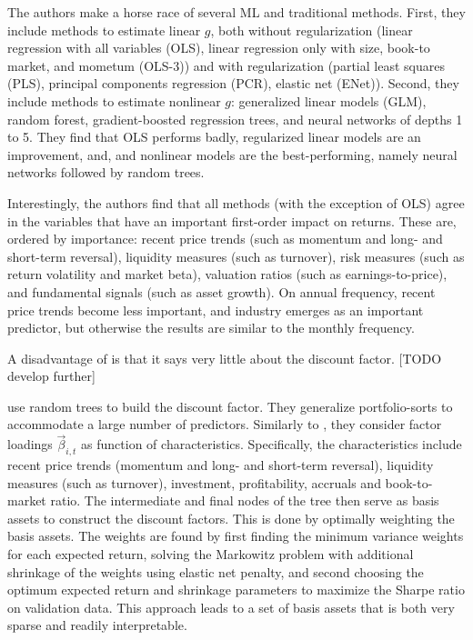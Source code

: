 		
		The authors make a horse race of several ML and traditional methods. First, they include methods to estimate linear $g$, both without regularization (linear regression with all variables (OLS), linear regression only with size, book-to market, and mometum (OLS-3)) and with regularization (partial least squares (PLS), principal components regression (PCR), elastic net (ENet)). Second, they include methods to estimate nonlinear $g$: generalized linear models (GLM), random forest, gradient-boosted regression trees, and neural networks of depths 1 to 5. They find that OLS performs badly, regularized linear models are an improvement, and, and nonlinear models are the best-performing, namely neural networks followed by random trees. 
		
		Interestingly, the authors find that all methods (with the exception of OLS) agree in the variables that have an important first-order impact on returns. These are, ordered by importance: recent price trends (such as momentum and long- and short-term reversal), liquidity measures (such as turnover), risk measures (such as return volatility and market beta), valuation ratios (such as earnings-to-price), and fundamental signals (such as asset growth). On annual frequency, recent price trends become less important, and industry emerges as an important predictor, but otherwise the results are similar to the monthly frequency.
		
		
		A disadvantage of \cite{gu2020empirical} is that it says very little about the discount factor. [TODO develop further] 
		
		
		\cite{bryzgalova2019forest} use random trees to build the discount factor. They generalize portfolio-sorts to accommodate a large number of predictors. Similarly to \cite{kelly2019characteristics}, they consider factor loadings $\vec{\beta}_{i,t}$ as function of characteristics. Specifically, the characteristics include recent price trends (momentum and long- and short-term reversal), liquidity measures (such as turnover), investment, profitability, accruals and book-to-market ratio. The intermediate and final nodes of the tree then serve as basis assets to construct the discount factors. This is done by optimally weighting the basis assets. The weights are found by first finding the minimum variance weights for each expected return, solving the Markowitz problem with additional shrinkage of the weights using elastic net penalty, and second choosing the optimum expected return and shrinkage parameters to maximize the Sharpe ratio on validation data. This approach leads to a set of basis assets that is both very sparse and readily interpretable. 
				
